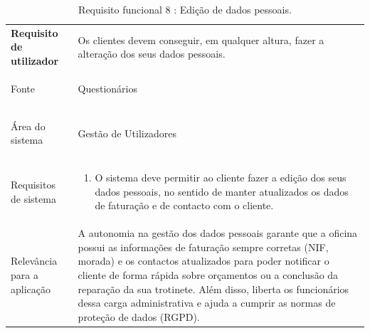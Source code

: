 \documentclass[a4paper,12pt]{scrreprt}
\begin{document}
\begin{table}[H]
    \centering
    \renewcommand{\arraystretch}{1.5} 
    
    \begin{tabular}{|>{\columncolor{gray!15}\bfseries}p{4cm}|p{10.5cm}|}
        \hline
        Requisito de utilizador & Os clientes devem conseguir, em qualquer altura, fazer a alteração dos seus dados pessoais. \\ \hdashline
        
        Fonte & Questionários \\ \hdashline
        
        Área do sistema & Gestão de Utilizadores \\ \hdashline
        
        Requisitos de sistema & 
        \begin{enumerate}[leftmargin=*, nosep, topsep=2pt, partopsep=0pt]
            \item O sistema deve permitir ao cliente fazer a edição dos seus dados pessoais, no sentido de manter atualizados os dados de faturação e de contacto com o cliente.
        \end{enumerate} \\ \hdashline
        
        Relevância para a aplicação & A autonomia na gestão dos dados pessoais garante que a oficina possui as informações de faturação sempre corretas (NIF, morada) e os contactos atualizados para poder notificar o cliente de forma rápida sobre orçamentos ou a conclusão da reparação da sua trotinete. Além disso, liberta os funcionários dessa carga administrativa e ajuda a cumprir as normas de proteção de dados (RGPD).\\ \hline
    \end{tabular}
    \caption{Requisito funcional 8 : Edição de dados pessoais.}
    \label{tab:rf_edicao_dados}
\end{table}


\paragraph{}
\end{document}
